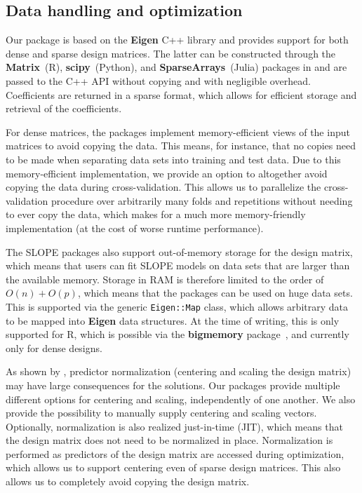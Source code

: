 \documentclass[a4paper,fleqn]{cas-sc}
\begin{document}
\subsection{Data handling and optimization}

Our package is based on the \textbf{Eigen} \textsf{C++} library and provides
support for both dense and sparse design matrices. The latter can be constructed
through the \textbf{Matrix}~(\textsf{R}), \textbf{scipy}~(\textsf{Python}), and
\textbf{SparseArrays}~(\textsf{Julia}) packages in and are passed to the
\textsf{C++} API without copying and with negligible overhead. Coefficients are
returned in a sparse format, which allows for efficient storage and retrieval of
the coefficients.

For dense matrices, the packages implement memory-efficient views of the input
matrices to avoid copying the data. This means, for instance, that no copies
need to be made when separating data sets into training and test data. Due to
this memory-efficient implementation, we provide an option to altogether avoid
copying the data during cross-validation. This allows us to parallelize the
cross-validation procedure over arbitrarily many folds and repetitions without
needing to ever copy the data, which makes for a much more memory-friendly
implementation (at the cost of worse runtime performance).

The SLOPE packages also support out-of-memory storage for the design matrix,
which means that users can fit SLOPE models on data sets that are larger than
the available memory. Storage in RAM is therefore limited to the order of
\(O(n) + O(p)\), which means that the packages can be used on huge data sets.
This is supported via the generic \texttt{Eigen::Map} class, which allows
arbitrary data to be mapped into \textbf{Eigen} data structures. At the time of
writing, this is only supported for \textsf{R}, which is possible via the
\textbf{bigmemory} package~\citep{kane2013}, and currently only for dense
designs.

As shown by \citet{larsson2025}, predictor normalization (centering and scaling
the design matrix) may have large consequences for the solutions. Our packages
provide multiple different options for centering and scaling, independently of
one another. We also provide the possibility to manually supply centering and
scaling vectors. Optionally, normalization is also realized just-in-time (JIT),
which means that the design matrix does not need to be normalized in place.
Normalization is performed as predictors of the design matrix are accessed
during optimization, which allows us to support centering even of sparse design
matrices. This also allows us to completely avoid copying the design matrix.
\end{document}
